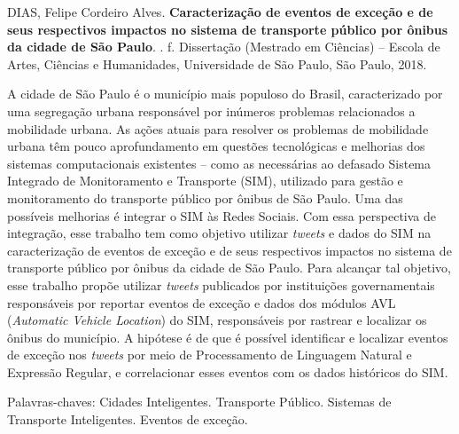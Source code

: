 \documentclass[
	12pt,				%
	oneside,			%
	a4paper,			%
	english,			%
	brazil				%
	]{abntex2ppgsi}
\begin{document}
\setlength{\absparsep}{18pt} %
\begin{resumo}

% 
%
% 
%
\begin{flushleft}
DIAS, Felipe Cordeiro Alves. \textbf{Caracterização de eventos de exceção e de seus respectivos impactos no sistema de transporte público por ônibus da cidade de São Paulo}. \imprimirdata. \pageref{LastPage} f. Dissertação (Mestrado em Ciências) – Escola de Artes, Ciências e Humanidades, Universidade de São Paulo, São Paulo, 2018.
\end{flushleft}

A cidade de São Paulo é o município mais populoso do Brasil, caracterizado por uma segregação urbana responsável por inúmeros problemas relacionados a mobilidade urbana. As ações atuais para resolver os problemas de mobilidade urbana têm pouco aprofundamento em questões tecnológicas e melhorias dos sistemas computacionais existentes -- como as necessárias ao defasado Sistema Integrado de Monitoramento e Transporte (SIM), utilizado para gestão e monitoramento do transporte público por ônibus de São Paulo. Uma das possíveis melhorias é integrar o SIM às Redes Sociais. Com essa perspectiva de integração, esse trabalho tem como objetivo utilizar \textit{tweets} e dados do SIM na caracterização de eventos de exceção e de seus respectivos impactos no sistema de transporte público por ônibus da cidade de São Paulo. Para alcançar tal objetivo, esse trabalho propõe utilizar \textit{tweets} publicados por instituições governamentais responsáveis por reportar eventos de exceção e dados dos módulos AVL (\textit{Automatic Vehicle Location}) do SIM, responsáveis por rastrear e localizar os ônibus do município. A hipótese é de que é possível identificar e localizar eventos de exceção nos \textit{tweets} por meio de Processamento de Linguagem Natural e Expressão Regular, e correlacionar esses eventos com os dados históricos do SIM.

Palavras-chaves: Cidades Inteligentes. Transporte Público. Sistemas de Transporte Inteligentes. Eventos de exceção.
\end{resumo}
\end{document}
